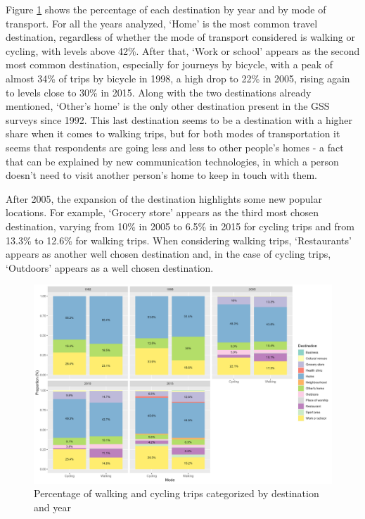 \documentclass[preprint, 3p,
authoryear]{elsarticle} %
\begin{document}
Figure \ref{fig:figure-destmodeyearperc} shows the percentage of each
destination by year and by mode of transport. For all the years
analyzed, `Home' is the most common travel destination, regardless of
whether the mode of transport considered is walking or cycling, with
levels above 42\%. After that, `Work or school' appears as the second
most common destination, especially for journeys by bicycle, with a peak
of almost 34\% of trips by bicycle in 1998, a high drop to 22\% in 2005,
rising again to levels close to 30\% in 2015. Along with the two
destinations already mentioned, `Other's home' is the only other
destination present in the GSS surveys since 1992. This last destination
seems to be a destination with a higher share when it comes to walking
trips, but for both modes of transportation it seems that respondents
are going less and less to other people's homes - a fact that can be
explained by new communication technologies, in which a person doesn't
need to visit another person's home to keep in touch with them.

After 2005, the expansion of the destination highlights some new popular
locations. For example, `Grocery store' appears as the third most chosen
destination, varying from 10\% in 2005 to 6.5\% in 2015 for cycling
trips and from 13.3\% to 12.6\% for walking trips. When considering
walking trips, `Restaurants' appears as another well chosen destination
and, in the case of cycling trips, `Outdoors' appears as a well chosen
destination.

\begin{figure}

{\centering \includegraphics[width=1\linewidth]{figures/destination_percentual} 

}

\caption{Percentage of walking and cycling trips categorized by destination and year}\label{fig:figure-destmodeyearperc}
\end{figure}
\end{document}
